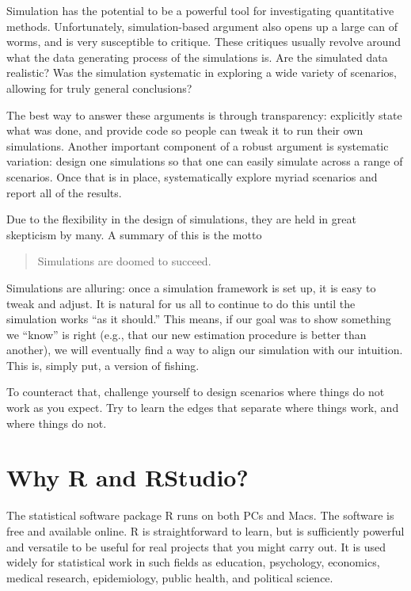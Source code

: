 \documentclass[
]{book}
\begin{document}
Simulation has the potential to be a powerful tool for investigating quantitative methods.
Unfortunately, simulation-based argument also opens up a large can of worms, and is very susceptible to critique.
These critiques usually revolve around what the data generating process of the simulations is.
Are the simulated data realistic?
Was the simulation systematic in exploring a wide variety of scenarios, allowing for truly general conclusions?

The best way to answer these arguments is through transparency: explicitly state what was done, and provide code so people can tweak it to run their own simulations.
Another important component of a robust argument is systematic variation: design one simulations so that one can easily simulate across a range of scenarios.
Once that is in place, systematically explore myriad scenarios and report all of the results.

Due to the flexibility in the design of simulations, they are held in great skepticism by many.
A summary of this is the motto

\begin{quote}
Simulations are doomed to succeed.
\end{quote}

Simulations are alluring: once a simulation framework is set up, it is easy to tweak and adjust.
It is natural for us all to continue to do this until the simulation works ``as it should.''
This means, if our goal was to show something we ``know'' is right (e.g., that our new estimation procedure is better than another), we will eventually find a way to align our simulation with our intuition.
This is, simply put, a version of fishing.

To counteract that, challenge yourself to design scenarios where things do not work as you expect.
Try to learn the edges that separate where things work, and where things do not.

\hypertarget{why-r-and-rstudio}{%
\section{Why R and RStudio?}\label{why-r-and-rstudio}}

The statistical software package R runs on both PCs and Macs. The software is free and available online.
R is straightforward to learn, but is sufficiently powerful and versatile to be useful for real projects that you might carry out.
It is used widely for statistical work in such fields as education, psychology, economics, medical research, epidemiology, public health, and political science.
\end{document}
